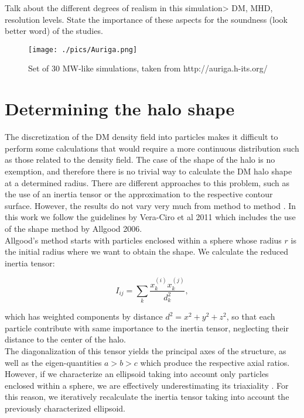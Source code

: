 Talk about the different degrees of realism in this simulation> DM, MHD, resolution levels. State the importance of these aspects for the soundness (look better word) of the studies.\\

\begin{figure}[!ht]
    \centering
    \texttt{[image: ./pics/Auriga.png]}
    \caption{Set of 30 MW-like simulations, taken from http://auriga.h-its.org/}
    \label{fig:auriga}
\end{figure}

\section{Determining the halo shape}
The discretization of the DM density field into particles makes it difficult  to perform some calculations that would require a more continuous distribution such as those related to the density field. The case of the shape of the halo is no exemption, and therefore there is no trivial way to calculate the DM halo shape at a determined radius. There are different approaches to this problem, such as the use of an inertia tensor or the approximation to the respective contour surface.
However, the results do not vary very much from method to method \cite{Vera-Ciro et al. 2011}. In this work we follow the guidelines by Vera-Ciro et al 2011 which includes the use of the shape method by Allgood 2006\cite{AllGood2006}.\\

Allgood's method starts with particles enclosed within a sphere whose radius $r$ is the initial radius where we want to obtain the shape. We calculate the reduced inertia tensor:

\begin{equation}
I_{ij} = \sum_k \frac{x_k^{(i)}x_k^{(j)}}{d^2_k},
\label{eq:inertia}
\end{equation}

which has weighted components by distance $d^2=x^2+y^2+z^2$, so that each particle contribute with same importance to the inertia tensor, neglecting their distance to the center of the halo.\\

The diagonalization of this tensor yields the principal axes of the structure, as well as the eigen-quantities $a>b>c$ which produce the respective axial ratios. However, if we characterize an ellipsoid taking into account only particles enclosed within a sphere, we are effectively underestimating its triaxiality \cite{AllGood}. For this reason, we iteratively recalculate the inertia tensor taking into account the previously characterized ellipsoid.\\

